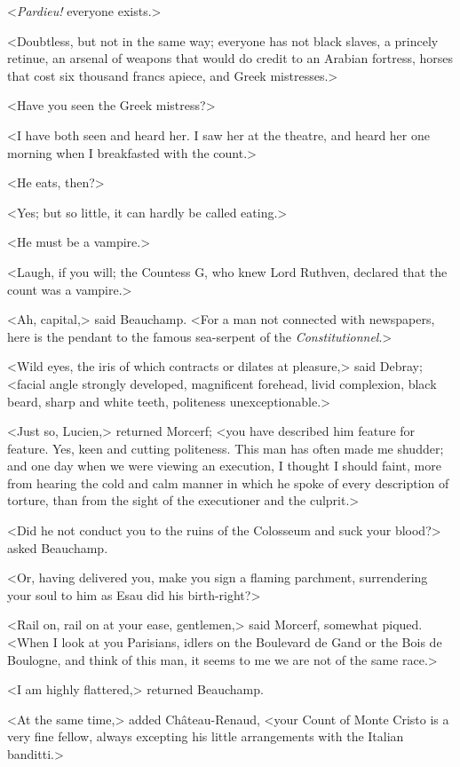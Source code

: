  <\textit{Pardieu!} everyone exists.> 

 <Doubtless, but not in the same way; everyone has not black slaves, a princely retinue, an arsenal of weapons that would do credit to an Arabian fortress, horses that cost six thousand francs apiece, and Greek mistresses.> 

 <Have you seen the Greek mistress?> 

 <I have both seen and heard her. I saw her at the theatre, and heard her one morning when I breakfasted with the count.> 

 <He eats, then?> 

 <Yes; but so little, it can hardly be called eating.> 

 <He must be a vampire.> 

 <Laugh, if you will; the Countess G\doubleemdash, who knew Lord Ruthven, declared that the count was a vampire.> 

 <Ah, capital,> said Beauchamp. <For a man not connected with newspapers, here is the pendant to the famous sea-serpent of the \textit{Constitutionnel}.> 

 <Wild eyes, the iris of which contracts or dilates at pleasure,> said Debray; <facial angle strongly developed, magnificent forehead, livid complexion, black beard, sharp and white teeth, politeness unexceptionable.> 

 <Just so, Lucien,> returned Morcerf; <you have described him feature for feature. Yes, keen and cutting politeness. This man has often made me shudder; and one day when we were viewing an execution, I thought I should faint, more from hearing the cold and calm manner in which he spoke of every description of torture, than from the sight of the executioner and the culprit.> 

 <Did he not conduct you to the ruins of the Colosseum and suck your blood?> asked Beauchamp. 

 <Or, having delivered you, make you sign a flaming parchment, surrendering your soul to him as Esau did his birth-right?> 

 <Rail on, rail on at your ease, gentlemen,> said Morcerf, somewhat piqued. <When I look at you Parisians, idlers on the Boulevard de Gand or the Bois de Boulogne, and think of this man, it seems to me we are not of the same race.> 

 <I am highly flattered,> returned Beauchamp. 

 <At the same time,> added Château-Renaud, <your Count of Monte Cristo is a very fine fellow, always excepting his little arrangements with the Italian banditti.> 


